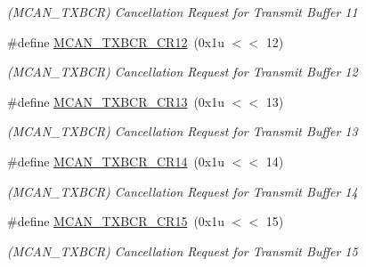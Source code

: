 \begin{DoxyCompactItemize}
\begin{DoxyCompactList}\small\item\em (M\+C\+A\+N\+\_\+\+T\+X\+B\+CR) Cancellation Request for Transmit Buffer 11 \end{DoxyCompactList}\item 
\mbox{\label{group__SAMV71__MCAN_ga20a2e4c54ab4f0e67046cb81636e7fd0}} 
\#define \mbox{\hyperlink{group__SAMV71__MCAN_ga20a2e4c54ab4f0e67046cb81636e7fd0}{M\+C\+A\+N\+\_\+\+T\+X\+B\+C\+R\+\_\+\+C\+R12}}~(0x1u $<$$<$ 12)
\begin{DoxyCompactList}\small\item\em (M\+C\+A\+N\+\_\+\+T\+X\+B\+CR) Cancellation Request for Transmit Buffer 12 \end{DoxyCompactList}\item 
\mbox{\label{group__SAMV71__MCAN_gaf10bc3a13267b9cefbfb5845aa43e4d3}} 
\#define \mbox{\hyperlink{group__SAMV71__MCAN_gaf10bc3a13267b9cefbfb5845aa43e4d3}{M\+C\+A\+N\+\_\+\+T\+X\+B\+C\+R\+\_\+\+C\+R13}}~(0x1u $<$$<$ 13)
\begin{DoxyCompactList}\small\item\em (M\+C\+A\+N\+\_\+\+T\+X\+B\+CR) Cancellation Request for Transmit Buffer 13 \end{DoxyCompactList}\item 
\mbox{\label{group__SAMV71__MCAN_gab90e264bd69bdc9a8ab84804f7d34591}} 
\#define \mbox{\hyperlink{group__SAMV71__MCAN_gab90e264bd69bdc9a8ab84804f7d34591}{M\+C\+A\+N\+\_\+\+T\+X\+B\+C\+R\+\_\+\+C\+R14}}~(0x1u $<$$<$ 14)
\begin{DoxyCompactList}\small\item\em (M\+C\+A\+N\+\_\+\+T\+X\+B\+CR) Cancellation Request for Transmit Buffer 14 \end{DoxyCompactList}\item 
\mbox{\label{group__SAMV71__MCAN_gad1f6bfff856c3ea8d375055d2d3bb9ff}} 
\#define \mbox{\hyperlink{group__SAMV71__MCAN_gad1f6bfff856c3ea8d375055d2d3bb9ff}{M\+C\+A\+N\+\_\+\+T\+X\+B\+C\+R\+\_\+\+C\+R15}}~(0x1u $<$$<$ 15)
\begin{DoxyCompactList}\small\item\em (M\+C\+A\+N\+\_\+\+T\+X\+B\+CR) Cancellation Request for Transmit Buffer 15 \end{DoxyCompactList}\item 

\end{DoxyCompactItemize}
